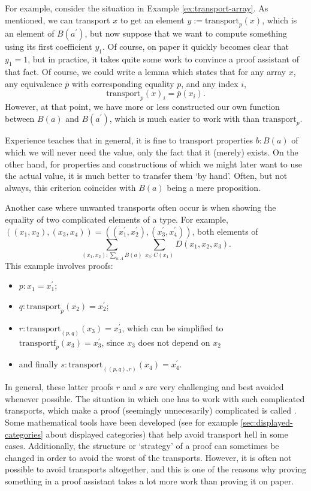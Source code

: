 For example, consider the situation in Example \ref{ex:transport-array}. As mentioned, we can transport $ x $ to get an element $ y := \mathrm{transport}_p(x) $, which is an element of $ B(a^\prime) $, but now suppose that we want to compute something using its first coefficient $ y_1 $. Of course, on paper it quickly becomes clear that $ y_1 = 1 $, but in practice, it takes quite some work to convince a proof assistant of that fact. Of course, we could write a lemma which states that for any array $ x $, any equivalence $ \overline p $ with corresponding equality $ p $, and any index $ i $,
\[ \mathrm{transport}_p(x)_i = \overline p(x_i). \]
However, at that point, we have more or less constructed our own function between $ B(a) $ and $ B(a^\prime) $, which is much easier to work with than $ \mathrm{transport}_p $.

Experience teaches that in general, it is fine to transport properties $ b: B(a) $ of which we will never need the value, only the fact that it (merely) exists. On the other hand, for properties and constructions of which we might later want to use the actual value, it is much better to transfer them `by hand'. Often, but not always, this criterion coincides with $ B(a) $ being a mere proposition.

Another case where unwanted transports often occur is when showing the equality of two complicated elements of a type. For example, $ ((x_1, x_2), (x_3, x_4)) = ((x^\prime_1, x^\prime_2), (x^\prime_3, x^\prime_4)) $, both elements of
\[ \sum_{(x_1, x_2): \sum_{a: A} B(a)} \sum_{x_3 : C(x_1)} D(x_1, x_2, x_3). \]
This example involves proofs:
\begin{itemize}
  \item $ p : x_1 = x^\prime_1 $;
  \item $ q : \mathrm{transport}_p(x_2) = x^\prime_2 $;
  \item $ r : \mathrm{transport}_{(p, q)}(x_3) = x^\prime_3 $, which can be simplified to $ \mathrm{transportf}_p(x_3) = x^\prime_3 $, since $ x_3 $ does not depend on $ x_2 $
  \item and finally $ s: \mathrm{transport}_{((p, q), r)}(x_4) = x^\prime_4 $.
\end{itemize}
In general, these latter proofs $ r $ and $ s $ are very challenging and best avoided whenever possible. The situation in which one has to work with such complicated transports, which make a proof (seemingly unnecesarily) complicated is called . Some mathematical tools have been developed (see for example \ref{sec:displayed-categories} about displayed categories) that help avoid transport hell in some cases. Additionally, the structure or `strategy' of a proof can sometimes be changed in order to avoid the worst of the transports. However, it is often not possible to avoid transports altogether, and this is one of the reasons why proving something in a proof assistant takes a lot more work than proving it on paper.
